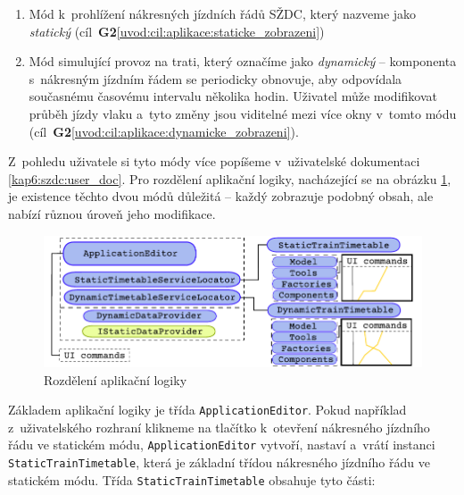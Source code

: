 \begin{enumerate}
\item Mód k~prohlížení nákresných jízdních řádů SŽDC, který nazveme jako \textit{statický} (cíl~\textbf{\color{goalcolor}G2}\ref{uvod:cil:aplikace:staticke_zobrazeni})
\item Mód simulující provoz na trati, který označíme jako \textit{dynamický} -- komponenta s~nákresným jízdním řádem se periodicky obnovuje, aby odpovídala současnému časovému intervalu několika hodin. Uživatel může modifikovat průběh jízdy vlaku a~tyto změny jsou viditelné mezi více okny v~tomto módu (cíl~\textbf{\color{goalcolor}G2}\ref{uvod:cil:aplikace:dynamicke_zobrazeni}).
\end{enumerate}
\newpage
Z~pohledu uživatele si tyto módy více popíšeme v~uživatelské dokumentaci \ref{kap6:szdc:user_doc}. Pro rozdělení aplikační logiky, nacházející se na obrázku \ref{fig:kap6:szdc_application_logic}, je existence těchto dvou módů důležitá -- každý zobrazuje podobný obsah, ale nabízí různou úroveň jeho modifikace.

\begin{figure}[!hbt]
	\centering
	\includegraphics[width=\textwidth]{../img/kap6_szdc_application_logic}
	\caption{Rozdělení aplikační logiky}
	\label{fig:kap6:szdc_application_logic}
\end{figure}

Základem aplikační logiky je třída \texttt{ApplicationEditor}. Pokud například \linebreak z~uživatelského rozhraní klikneme na tlačítko k~otevření nákresného jízdního řádu ve statickém módu, \texttt{ApplicationEditor} vytvoří, nastaví a~vrátí instanci \linebreak \texttt{StaticTrainTimetable}, která je základní třídou nákresného jízdního řádu ve statickém módu. Třída \texttt{StaticTrainTimetable} obsahuje tyto části:

